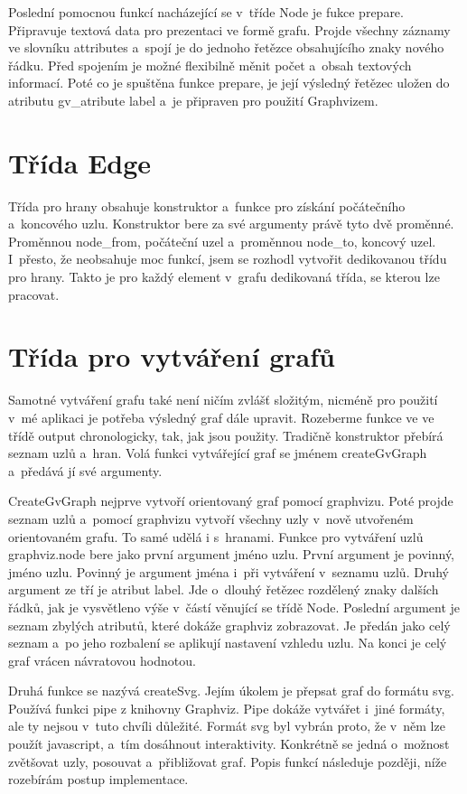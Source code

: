 \documentclass[color,table,oneside,nolot,nolof]{fithesis}
\begin{document}
	Poslední pomocnou funkcí nacházející se v~tříde Node je fukce prepare. Připravuje textová data pro prezentaci ve formě grafu. Projde všechny záznamy ve slovníku attributes a~spojí je do 
	jednoho řetězce obsahujícího znaky nového řádku. Před spojením je možné flexibilně měnit počet a~obsah textových informací. Poté co je spuštěna funkce prepare, je její výsledný řetězec
	uložen do atributu gv\_atribute label a~je připraven pro použití Graphvizem.

\section{Třída Edge}
	Třída pro hrany obsahuje konstruktor a~funkce pro získání počátečního a~koncového uzlu. Konstruktor bere za své argumenty právě tyto dvě 
	proměnné. Proměnnou node\_from, počáteční uzel a~proměnnou node\_to, koncový uzel. I~přesto, že neobsahuje moc funkcí, jsem se rozhodl vytvořit dedikovanou třídu pro hrany. 
	Takto je pro každý element v~grafu dedikovaná třída, se kterou lze pracovat.

\section{Třída pro vytváření grafů}
	Samotné vytváření grafu také není ničím zvlášť složitým, nicméně pro použití v~mé aplikaci je potřeba výsledný graf dále upravit. Rozeberme funkce ve ve třídě output chronologicky,
	tak, jak jsou použity. Tradičně konstruktor přebírá seznam uzlů a~hran. Volá funkci vytvářející graf se jménem createGvGraph a~předává jí své argumenty. 

	CreateGvGraph nejprve vytvoří orientovaný graf pomocí graphvizu. Poté projde seznam uzlů a~pomocí graphvizu vytvoří všechny uzly v~nově utvořeném orientovaném grafu. To samé udělá i
	s~hranami. Funkce pro vytváření uzlů graphviz.node bere jako první argument jméno uzlu. První argument je povinný, jméno uzlu. Povinný je argument jména
	i~při vytváření v~seznamu uzlů. Druhý argument ze tří je atribut label. Jde o~dlouhý řetězec rozdělený znaky dalších řádků, jak je vysvětleno výše v~částí věnující se třídě Node.
	Poslední argument je seznam zbylých atributů, které dokáže graphviz zobrazovat. Je předán jako celý seznam a~po jeho rozbalení se aplikují nastavení vzhledu uzlu. Na konci je celý
	graf vrácen návratovou hodnotou.

	Druhá funkce se nazývá createSvg. Jejím úkolem je přepsat graf do formátu svg. Používá funkci pipe z knihovny Graphviz. Pipe dokáže vytvářet i~jiné formáty, ale ty nejsou v~tuto
	chvíli důležité. Formát svg byl vybrán proto, že v~něm lze použít javascript, a~tím dosáhnout interaktivity. Konkrétně se jedná o~možnost zvětšovat uzly, posouvat a~přibližovat graf.
	Popis funkcí následuje později, níže rozebírám postup implementace.
\end{document}
